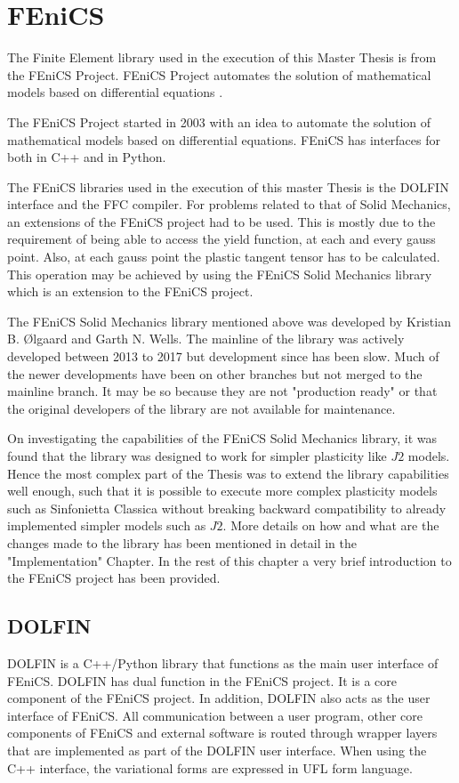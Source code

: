 \chapter{FEniCS}

The Finite Element library used in the execution of this Master Thesis is from  the FEniCS Project\cite{FenicsWebsite}. FEniCS Project  automates the solution of mathematical models based on differential equations \cite{fenics_book}.

The FEniCS Project started in 2003 with an idea to automate the solution of mathematical models based on differential equations. FEniCS has interfaces for both in C++ and in Python.\cite{fenics_book}

The FEniCS libraries used in the execution of this master Thesis is the DOLFIN interface and the FFC compiler. For problems related to that of Solid Mechanics, an extensions of the FEniCS project had to be used. This is mostly due to the requirement of being able to access the yield function, at each and every gauss point. Also, at each gauss point the plastic tangent tensor has to be calculated. This operation may be achieved by using the FEniCS Solid Mechanics library which is an extension to the FEniCS project.

The FEniCS Solid Mechanics library mentioned above was developed by Kristian B. Ølgaard and Garth N. Wells. The mainline of the library was actively developed between 2013 to 2017 but development since has been slow. Much of the newer developments have been on other branches but not merged to the mainline branch. It may be so because they are not "production ready" or that the original developers of the library are not available for maintenance. 

On investigating the capabilities of the FEniCS Solid Mechanics library, it was found that the library was designed to work for simpler plasticity like $J2$ models. Hence the most complex part of the Thesis was to extend the library capabilities well enough, such that it is possible to execute more complex plasticity models such as Sinfonietta Classica without breaking backward compatibility to already implemented simpler models such as $J2$. More details on how and what are the changes made to the library has been mentioned in detail in the "Implementation" Chapter. In the rest of this chapter a very brief introduction to the FEniCS project has been provided.

\section*{DOLFIN}
DOLFIN is a C++/Python library that functions as the main user interface of FEniCS.
DOLFIN has dual function in the FEniCS project. It is a core component of the FEniCS project. In addition, DOLFIN also acts as the user interface of FEniCS. All communication between a user program, other core components of FEniCS and external software is routed through wrapper layers that are implemented as part of the DOLFIN user interface. When using the C++ interface, the variational forms are expressed in UFL form language.\cite{fenics_book}\\
 
